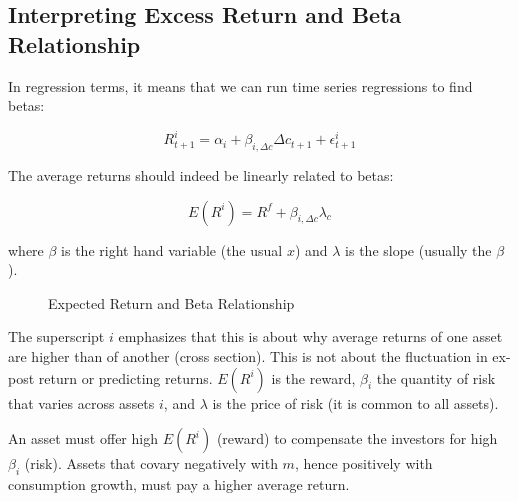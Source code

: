 \subsection{Interpreting Excess Return and Beta Relationship}

In regression terms, it means that we can run time series 
regressions to find betas:

\begin{equation}
    R^i_{t+1} = \alpha_i + \beta_{i,\Delta c} \Delta c_{t+1} + \epsilon^i_{t+1}
\end{equation}

The average returns should indeed be linearly related to 
betas:

\begin{equation}
    E(R^i) = R^f + \beta_{i,\Delta c} \lambda_c
\end{equation}

where $\beta$ is the right hand variable (the usual $x$) and 
$\lambda$ is the slope (usually the $\beta$).

\begin{figure}[htbp]
    \centering
{}
    \caption{Expected Return and Beta Relationship}
    \label{fig:expected_return_beta}
\end{figure}

The superscript $i$ emphasizes that this is about 
why average returns of one asset are higher than of another 
(cross section). This is not about the fluctuation in ex-post return
or predicting returns. $E(R^i)$ is the reward, $\beta_i$ the 
quantity of risk that varies across assets $i$, and 
$\lambda$ is the price of risk (it is common to all assets).

An asset must offer high $E(R^i)$ (reward) to compensate
the investors for high $\beta_i$ (risk). 
Assets that covary negatively with $m$, hence positively 
with consumption growth, must pay a higher average return. 


\begin{tcolorbox}[colback=white, colframe=black, title=Example X]
    


\end{tcolorbox}


